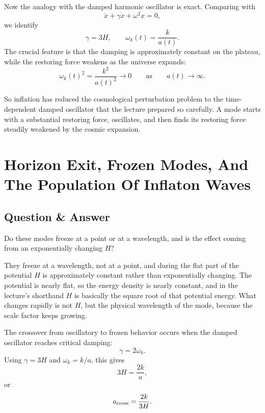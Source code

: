 Now the analogy with the damped harmonic oscillator is exact. Comparing with
\begin{equation}
\ddot x+\gamma\dot x+\omega^{2}x=0,
\end{equation}
we identify
\begin{equation}
\gamma=3H, \qquad \omega_k(t)=\frac{k}{a(t)}.
\end{equation}
The crucial feature is that the damping is approximately constant on the plateau, while the restoring force weakens as the universe expands:
\begin{equation}
\omega_k(t)^2=\frac{k^2}{a(t)^2}\longrightarrow 0
\qquad \text{as} \qquad a(t)\longrightarrow \infty.
\end{equation}

So inflation has reduced the cosmological perturbation problem to the time-dependent damped oscillator that the lecture prepared so carefully. A mode starts with a substantial restoring force, oscillates, and then finds its restoring force steadily weakened by the cosmic expansion.

\section{Horizon Exit, Frozen Modes, And The Population Of Inflaton Waves}

\subsection{Question \& Answer}

Do these modes freeze at a point or at a wavelength, and is the effect coming from an exponentially changing \(H\)?

They freeze at a wavelength, not at a point, and during the flat part of the potential \(H\) is approximately constant rather than exponentially changing. The potential is nearly flat, so the energy density is nearly constant, and in the lecture's shorthand \(H\) is basically the square root of that potential energy. What changes rapidly is not \(H\), but the physical wavelength of the mode, because the scale factor keeps growing.

The crossover from oscillatory to frozen behavior occurs when the damped oscillator reaches critical damping:
\begin{equation}
\gamma=2\omega_k.
\end{equation}
Using \(\gamma=3H\) and \(\omega_k=k/a\), this gives
\begin{equation}
3H=\frac{2k}{a},
\end{equation}
or
\begin{equation}
a_{\rm cross}=\frac{2k}{3H}.
\end{equation}

